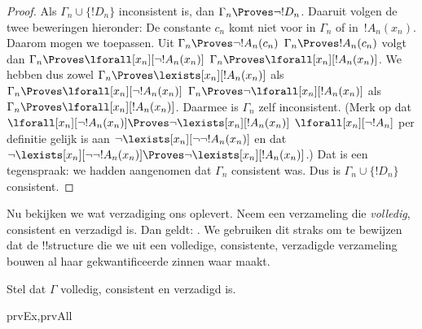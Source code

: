\documentclass[openany]{memoir}
\begin{document}
\begin{proof}
Als $\Gamma_n \cup \{!D_n\}$ inconsistent is, dan $\Gamma_n
\Proves \lnot !D_n$. Daaruit volgen de twee beweringen hieronder:
De constante $c_n$ komt niet voor in
$\Gamma_n$ of in~$!A_n(x_n)$. Daarom mogen we
toepassen. Uit 
{$\Gamma_n \Proves \lnot !A_n(c_n)$}
{$\Gamma_n \Proves !A_n(c_n)$}
volgt dan
{$\Gamma_n \Proves \lforall[x_n][\lnot !A_n(x_n)]$}
{$\Gamma_n \Proves \lforall[x_n][!A_n(x_n)]$}.
We hebben dus zowel
{$\Gamma_n \Proves \lexists[x_n][!A_n(x_n)]$ als
$\Gamma_n \Proves \lforall[x_n][\lnot !A_n(x_n)]$}
{$\Gamma_n \Proves \lnot\lforall[x_n][!A_n(x_n)]$ als
$\Gamma_n \Proves \lforall[x_n][!A_n(x_n)]$}.
Daarmee is $\Gamma_n$ zelf inconsistent.
{(Merk op dat
{$\lforall[x_n][\lnot !A_n(x_n)] \Proves
  \lnot\lexists[x_n][!A_n(x_n)]$}
{$\lforall[x_n][\lnot !A_n]$ per definitie gelijk is aan
  $\lnot\lexists[x_n][\lnot\lnot !A_n(x_n)]$ en dat
  $\lnot\lexists[x_n][\lnot\lnot !A_n(x_n)] \Proves
  \lnot\lexists[x_n][!A_n(x_n)]$}.)}{}
Dat is een tegenspraak: we hadden aangenomen dat $\Gamma_n$ consistent
was. Dus is $\Gamma_n \cup \{ !D_n\}$ consistent.
\end{proof}

\begin{explain}
Nu bekijken we wat verzadiging ons oplevert. Neem een verzameling die
\emph{volledig}, consistent en verzadigd is. Dan geldt:
. We
gebruiken dit straks om te bewijzen dat de !!{structure} die we uit een
volledige, consistente, verzadigde verzameling bouwen al haar
gekwantificeerde zinnen waar maakt.
\end{explain}

\begin{prop}
Stel dat $\Gamma$ volledig, consistent en verzadigd is.
\begin{tagenumerate}{prvEx,prvAll}
\end{tagenumerate}
\end{prop}
\end{document}
